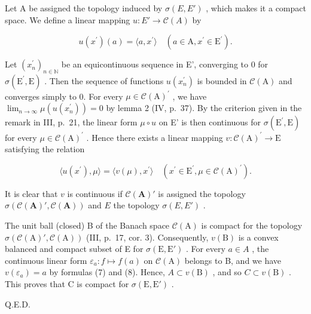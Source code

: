 Let A be assigned the topology induced by \(\sigma(E, E')\) , which makes it a compact space. We define a linear mapping \(u: E' \to \mathcal{C}(A)\) by

\[
u (x ^ {\prime}) (a) = \langle a, x ^ {\prime} \rangle \quad (a \in \mathrm{A}, x ^ {\prime} \in \mathrm{E} ^ {\prime}).\tag{7}
\]

Let \((x_{n}^{\prime})_{n\in\mathbb{N}}\) be an equicontinuous sequence in E', converging to 0 for \(\sigma(\mathrm{E}^{\prime},\mathrm{E})\) . Then the sequence of functions \(u(x_{n}^{\prime})\) is bounded in \(\mathcal{C}(\mathrm{A})\) and converges simply to 0. For every \(\mu\in\mathcal{C}(\mathrm{A})^{\prime}\) , we have \(\lim_{n\to\infty}\mu(u(x_{n}^{\prime}))=0\) by lemma 2 (IV, p.~37). By the criterion given in the remark in III, p.~21, the linear form \(\mu\circ u\) on E' is then continuous for \(\sigma(\mathrm{E}^{\prime},\mathrm{E})\) for every \(\mu\in\mathcal{C}(\mathrm{A})^{\prime}\) . Hence there exists a linear mapping \(v:\mathcal{C}(\mathrm{A})^{\prime}\to\mathrm{E}\) satisfying the relation

\[
\langle u (x ^ {\prime}), \mu \rangle = \langle v (\mu), x ^ {\prime} \rangle \quad \left(x ^ {\prime} \in \mathrm{E} ^ {\prime}, \mu \in \mathcal {C} (\mathrm{A}) ^ {\prime}\right).\tag{8}
\]

It is clear that \(v\) is continuous if \(\mathcal{C}(\mathbf{A})'\) is assigned the topology \(\sigma(\mathcal{C}(\mathbf{A})', \mathcal{C}(\mathbf{A}))\) and \(E\) the topology \(\sigma(E, E')\) .

The unit ball (closed) B of the Banach space \(\mathcal{C}(\mathrm{A})\) is compact for the topology \(\sigma(\mathcal{C}(\mathrm{A})', \mathcal{C}(\mathrm{A}))\) (III, p.~17, cor. 3). Consequently, \(v(\mathrm{B})\) is a convex balanced and compact subset of E for \(\sigma(\mathrm{E}, \mathrm{E}')\) . For every \(a \in A\) , the continuous linear form \(\varepsilon_a : f \mapsto f(a)\) on \(\mathcal{C}(\mathrm{A})\) belongs to B, and we have \(v(\varepsilon_a) = a\) by formulas (7) and (8). Hence, \(A \subset v(\mathrm{B})\) , and so \(C \subset v(\mathrm{B})\) . This proves that C is compact for \(\sigma(\mathrm{E}, \mathrm{E}')\) .

Q.E.D.

